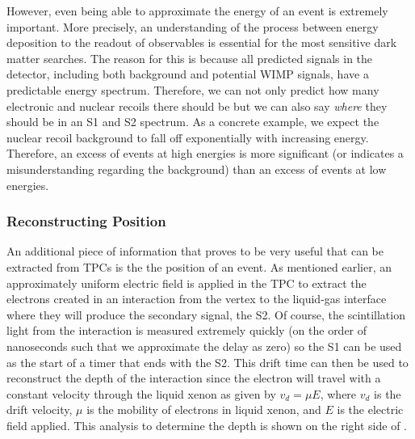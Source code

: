 However, even being able to approximate the energy of an event is extremely important.  More precisely, an understanding of the process between energy deposition to the readout of observables is essential for the most sensitive dark matter searches.  The reason for this is because all predicted signals in the detector, including both background and potential WIMP signals, have a predictable energy spectrum.  Therefore, we can not only predict how many electronic and nuclear recoils there should be but we can also say \textit{where} they should be in an S1 and S2 spectrum.  As a concrete example, we expect the nuclear recoil background to fall off exponentially with increasing energy.  Therefore, an excess of events at high energies is more significant (or indicates a misunderstanding regarding the background) than an excess of events at low energies.


\subsubsection{Reconstructing Position}

An additional piece of information that proves to be very useful that can be extracted from TPCs is the the position of an event.  As mentioned earlier, an approximately uniform electric field is applied in the TPC to extract the electrons created in an interaction from the vertex to the liquid-gas interface where they will produce the secondary signal, the S2.  Of course, the scintillation light from the interaction is measured extremely quickly (on the order of nanoseconds such that we approximate the delay as zero) so the S1 can be used as the start of a timer that ends with the S2.  This drift time can then be used to reconstruct the depth of the interaction since the electron will travel with a constant velocity through the liquid xenon as given by $v_d = \mu E$, where $v_d$ is the drift velocity, $\mu$ is the mobility of electrons in liquid xenon, and $E$ is the electric field applied.   This analysis to determine the depth is shown on the right side of .

